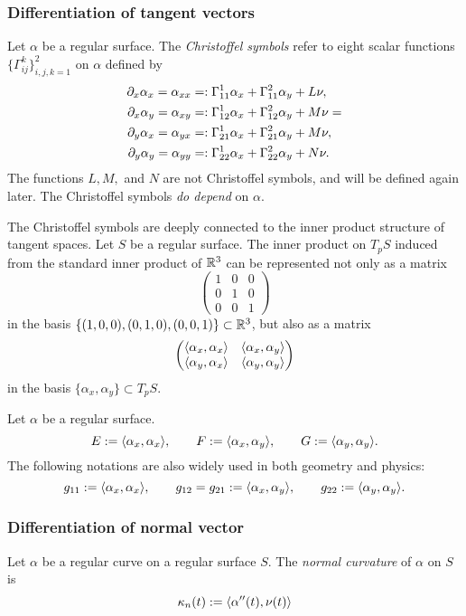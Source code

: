 \documentclass{../exp}
\def\a{\alpha}
\begin{document}
\subsubsection{Differentiation of tangent vectors}
\begin{defn}
Let $\a$ be a regular surface.
The \emph{Christoffel symbols} refer to eight scalar functions $\{\Gamma_{ij}^k\}_{i,j,k=1}^2$ on $\a$ defined by
\begin{align*}
\pd_x\a_x=\a_{xx}&=:\Gamma_{11}^1\a_x+\Gamma_{11}^2\a_y+L\nu,\\
\pd_x\a_y=\a_{xy}&=:\Gamma_{12}^1\a_x+\Gamma_{12}^2\a_y+M\nu=\\
\pd_y\a_x=\a_{yx}&=:\Gamma_{21}^1\a_x+\Gamma_{21}^2\a_y+M\nu,\\
\pd_y\a_y=\a_{yy}&=:\Gamma_{22}^1\a_x+\Gamma_{22}^2\a_y+N\nu.
\end{align*}
The functions $L,M,$ and $N$ are not Christoffel symbols, and will be defined again later.
The Christoffel symbols \emph{do depend} on $\a$.
\end{defn}

The Christoffel symbols are deeply connected to the inner product structure of tangent spaces.
Let $S$ be a regular surface.
The inner product on $T_pS$ induced from the standard inner product of $\mathbb{R}^3$ can be represented not only as a matrix
\[\begin{pmatrix}1&0&0\\0&1&0\\0&0&1\end{pmatrix}\]
in the basis $\{(1,0,0),(0,1,0),(0,0,1)\}\subset\mathbb{R}^3$, but also as a matrix
\[\begin{pmatrix}\<\a_x,\a_x\>&\<\a_x,\a_y\>\\\<\a_y,\a_x\>&\<\a_y,\a_y\>\end{pmatrix}\]
in the basis $\{\a_x,\a_y\}\subset T_pS$.

\begin{defn}
Let $\a$ be a regular surface.
\[E:=\<\a_x,\a_x\>,\qquad F:=\<\a_x,\a_y\>,\qquad G:=\<\a_y,\a_y\>.\]
The following notations are also widely used in both geometry and physics:
\[g_{11}:=\<\a_x,\a_x\>,\qquad g_{12}=g_{21}:=\<\a_x,\a_y\>,\qquad g_{22}:=\<\a_y,\a_y\>.\]
\end{defn}


\subsubsection{Differentiation of normal vector}
\begin{defn}
Let $\a$ be a regular curve on a regular surface $S$.
The \emph{normal curvature} of $\a$ on $S$ is
\[\kappa_n(t):=\<\a''(t),\nu(t)\>\]
\end{defn}
\end{document}
